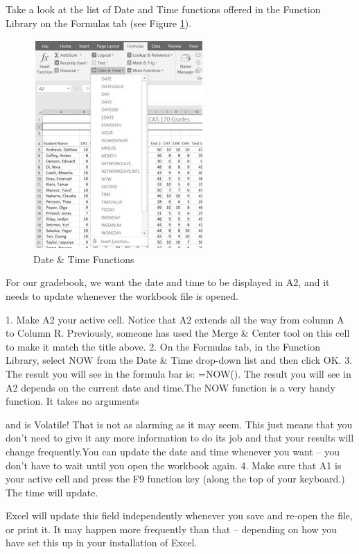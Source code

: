 Take a look at the list of Date and Time functions offered in the Function Library on the Formulas tab (see Figure \ref{03:fig16}).

\begin{figure}[H]
	\centering
	\includegraphics[width=\maxwidth{.95\linewidth}]{gfx/ch03_fig16}
	\caption{Date \& Time Functions}
	\label{03:fig16}
\end{figure}

For our gradebook, we want the date and time to be displayed in \textsf{A2}, and it needs to update whenever the workbook file is opened.

1. Make A2 your active cell. Notice that A2 extends all the way from column A to Column R.
Previously, someone has used the Merge \& Center tool on this cell to make it match the title
above.
2. On the Formulas tab, in the Function Library, select NOW from the Date \& Time drop-down
list and then click OK.
3. The result you will see in the formula bar is: =NOW(). The result you will see in A2 depends on
the current date and time.The NOW function is a very handy function. It takes no arguments

and is Volatile! That is not as alarming as it may seem. This just means that you don’t need to
give it any more information to do its job and that your results will change frequently.You can
update the date and time whenever you want – you don’t have to wait until you open the
workbook again.
4. Make sure that A1 is your active cell and press the F9 function key (along the top of your
keyboard.) The time will update.

Excel will update this field independently whenever you save and re-open the file, or print it. It may
happen more frequently than that – depending on how you have set this up in your installation of
Excel.


